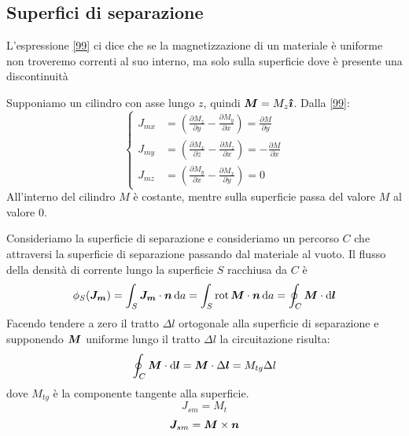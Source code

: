 \subsection{Superfici di separazione}
L'espressione \eqref{99} ci dice che se la magnetizzazione di un materiale è uniforme non troveremo correnti al suo interno, ma solo sulla superficie dove è presente una discontinuità

Supponiamo un cilindro con asse lungo $z$, quindi $\boldsymbol{M}=M_z\boldsymbol{\hat {\imath}}$. Dalla \eqref{99}:
\begin{equation}
\left\{
\begin{split}
J_{mx}&=\left(\frac{\partial M_z}{\partial y}-\frac{\partial M_y}{\partial x}\right)=\frac{\partial M}{\partial y}\\
J_{my}&=\left(\frac{\partial M_x}{\partial z}-\frac{\partial M_z}{\partial x}\right)=-\frac{\partial M}{\partial x}\\
J_{mz}&=\left(\frac{\partial M_y}{\partial x}-\frac{\partial M_x}{\partial y}\right)=0
\end{split}
\right.
\end{equation}
All'interno del cilindro $M$ è costante, mentre sulla superficie passa del valore $M$ al valore $0$.

Consideriamo la superficie di separazione e consideriamo un percorso $C$ che attraversi la superficie di separazione passando dal materiale al vuoto. Il flusso della densità di corrente lungo la superficie $S$ racchiusa da $C$ è 
\begin{equation}
\phi_S(\boldsymbol{J_m})=\int_S \boldsymbol{J_m}\cdot\boldsymbol{n}\,\mathrm{d} a=\int_S \operatorname{rot}\boldsymbol{M}\cdot\boldsymbol{n}\,\mathrm{d} a=\oint_C \boldsymbol{M}\cdot\mathrm{d}\boldsymbol{l}
\end{equation}
Facendo tendere a zero il tratto $\Delta l$ ortogonale alla superficie di separazione e supponendo $\boldsymbol{M}$ uniforme lungo il tratto $\Delta l$ la circuitazione risulta:
\begin{equation}
\oint_C \boldsymbol{M}\cdot\mathrm{d}\boldsymbol{l}=\boldsymbol{M}\cdot \Delta \boldsymbol{l}=M_{tg}\Delta l
\end{equation}
dove $M_{tg}$ è la componente tangente alla superficie.
\begin{equation}
J_{sm}=M_t
\end{equation}
\begin{equation}
\boldsymbol{J}_{sm}=\boldsymbol{M}\times \boldsymbol{n}
\label{correnti_superficiali}
\end{equation}
